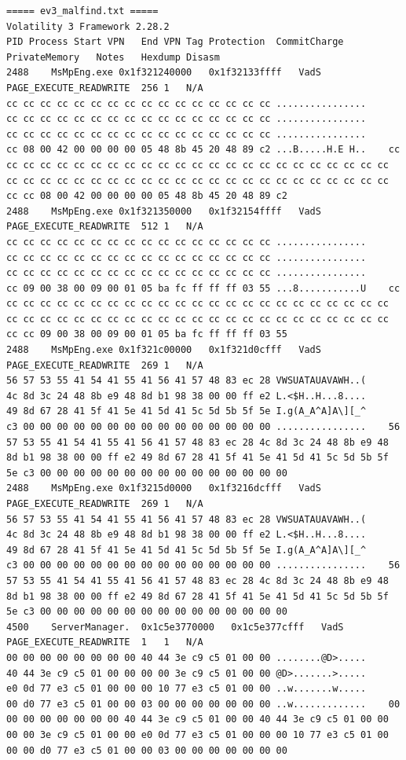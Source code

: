 \documentclass[11pt,letterpaper]{article}
\begin{document}
\begin{lstlisting}
===== ev3_malfind.txt =====
﻿Volatility 3 Framework 2.28.2
PID	Process	Start VPN	End VPN	Tag	Protection	CommitCharge	PrivateMemory	Notes	Hexdump	Disasm
2488	MsMpEng.exe	0x1f321240000	0x1f32133ffff	VadS	PAGE_EXECUTE_READWRITE	256	1	N/A	
cc cc cc cc cc cc cc cc cc cc cc cc cc cc cc cc ................
cc cc cc cc cc cc cc cc cc cc cc cc cc cc cc cc ................
cc cc cc cc cc cc cc cc cc cc cc cc cc cc cc cc ................
cc 08 00 42 00 00 00 00 05 48 8b 45 20 48 89 c2 ...B.....H.E H..	cc cc cc cc cc cc cc cc cc cc cc cc cc cc cc cc cc cc cc cc cc cc cc cc cc cc cc cc cc cc cc cc cc cc cc cc cc cc cc cc cc cc cc cc cc cc cc cc cc 08 00 42 00 00 00 00 05 48 8b 45 20 48 89 c2
2488	MsMpEng.exe	0x1f321350000	0x1f32154ffff	VadS	PAGE_EXECUTE_READWRITE	512	1	N/A	
cc cc cc cc cc cc cc cc cc cc cc cc cc cc cc cc ................
cc cc cc cc cc cc cc cc cc cc cc cc cc cc cc cc ................
cc cc cc cc cc cc cc cc cc cc cc cc cc cc cc cc ................
cc 09 00 38 00 09 00 01 05 ba fc ff ff ff 03 55 ...8...........U	cc cc cc cc cc cc cc cc cc cc cc cc cc cc cc cc cc cc cc cc cc cc cc cc cc cc cc cc cc cc cc cc cc cc cc cc cc cc cc cc cc cc cc cc cc cc cc cc cc 09 00 38 00 09 00 01 05 ba fc ff ff ff 03 55
2488	MsMpEng.exe	0x1f321c00000	0x1f321d0cfff	VadS	PAGE_EXECUTE_READWRITE	269	1	N/A	
56 57 53 55 41 54 41 55 41 56 41 57 48 83 ec 28 VWSUATAUAVAWH..(
4c 8d 3c 24 48 8b e9 48 8d b1 98 38 00 00 ff e2 L.<$H..H...8....
49 8d 67 28 41 5f 41 5e 41 5d 41 5c 5d 5b 5f 5e I.g(A_A^A]A\][_^
c3 00 00 00 00 00 00 00 00 00 00 00 00 00 00 00 ................	56 57 53 55 41 54 41 55 41 56 41 57 48 83 ec 28 4c 8d 3c 24 48 8b e9 48 8d b1 98 38 00 00 ff e2 49 8d 67 28 41 5f 41 5e 41 5d 41 5c 5d 5b 5f 5e c3 00 00 00 00 00 00 00 00 00 00 00 00 00 00 00
2488	MsMpEng.exe	0x1f3215d0000	0x1f3216dcfff	VadS	PAGE_EXECUTE_READWRITE	269	1	N/A	
56 57 53 55 41 54 41 55 41 56 41 57 48 83 ec 28 VWSUATAUAVAWH..(
4c 8d 3c 24 48 8b e9 48 8d b1 98 38 00 00 ff e2 L.<$H..H...8....
49 8d 67 28 41 5f 41 5e 41 5d 41 5c 5d 5b 5f 5e I.g(A_A^A]A\][_^
c3 00 00 00 00 00 00 00 00 00 00 00 00 00 00 00 ................	56 57 53 55 41 54 41 55 41 56 41 57 48 83 ec 28 4c 8d 3c 24 48 8b e9 48 8d b1 98 38 00 00 ff e2 49 8d 67 28 41 5f 41 5e 41 5d 41 5c 5d 5b 5f 5e c3 00 00 00 00 00 00 00 00 00 00 00 00 00 00 00
4500	ServerManager.	0x1c5e3770000	0x1c5e377cfff	VadS	PAGE_EXECUTE_READWRITE	1	1	N/A	
00 00 00 00 00 00 00 00 40 44 3e c9 c5 01 00 00 ........@D>.....
40 44 3e c9 c5 01 00 00 00 00 3e c9 c5 01 00 00 @D>.......>.....
e0 0d 77 e3 c5 01 00 00 00 10 77 e3 c5 01 00 00 ..w.......w.....
00 d0 77 e3 c5 01 00 00 03 00 00 00 00 00 00 00 ..w.............	00 00 00 00 00 00 00 00 40 44 3e c9 c5 01 00 00 40 44 3e c9 c5 01 00 00 00 00 3e c9 c5 01 00 00 e0 0d 77 e3 c5 01 00 00 00 10 77 e3 c5 01 00 00 00 d0 77 e3 c5 01 00 00 03 00 00 00 00 00 00 00

\end{lstlisting}
\end{document}

